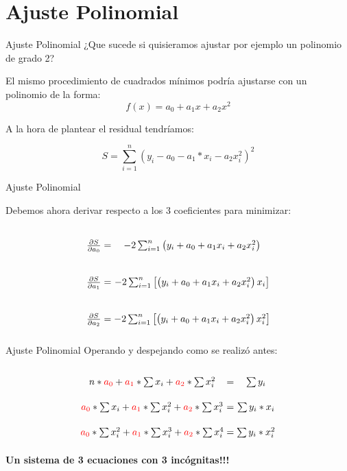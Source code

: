 \documentclass[xcolor=svgnames]{beamer} %
\theoremstyle{plain}
\renewcommand{\textbf}[1]{{\bfseries\textcolor{redUnq2}{#1}}}
\theoremstyle{definition}
\begin{document}
\section{Ajuste Polinomial}

\begin{frame}{Ajuste Polinomial}
  ¿Que sucede si quisieramos ajustar por ejemplo un polinomio de grado 2?\pause
  
  El mismo procedimiento de cuadrados mínimos podría ajustarse con un polinomio de la forma:
  $$ f(x) = a_0 + a_1 x + a_2 x^2$$
  
  A la hora de plantear el residual tendríamos:
  
  $$  S = \sum_{i=1}^n \left(y_i -a_0 -a_1*x_i -a_2 x_i^2\right)^2 $$
  
\end{frame}

\begin{frame}{Ajuste Polinomial}
  
  Debemos ahora derivar respecto a los 3 coeficientes para minimizar:
  $$\arraycolsep=1.4pt\def\arraystretch{3.2} \begin{array}{ccc}
  \frac{\partial S}{\partial a_0} &=& -2 \sum_{i=1}^n \left(y_i + a_0 +a_1 x_i +a_2 x_i^2\right)\\
  \frac{\partial S}{\partial a_1} &=& -2 \sum_{i=1}^n \left[\left(y_i + a_0 +a_1 x_i +a_2 x_i^2\right)x_i\right]\\
    \frac{\partial S}{\partial a_2} &=& -2 \sum_{i=1}^n \left[\left(y_i + a_0 +a_1 x_i +a_2 x_i^2\right)x_i^2\right]\\
\end{array}   $$
  
\end{frame}


\begin{frame}{Ajuste Polinomial}
  Operando y despejando como se realizó antes:
  
  $$\arraycolsep=1.4pt\def\arraystretch{2.2} \begin{array}{ccc}
  n*{\color{red}a_0}+{\color{red}a_1}*\sum x_i +{\color{red}a_2}* \sum x_i^2 &=& \sum y_i\\
  {\color{red}a_0}*\sum x_i+{\color{red}a_1}*\sum x_i^2 +{\color{red}a_2}* \sum x_i^3 &=& \sum y_i*x_i\\
  {\color{red}a_0}*\sum x_i^2+{\color{red}a_1}*\sum x_i^3 +{\color{red}a_2}* \sum x_i^4 &=& \sum y_i*x_i^2
\end{array}   $$\pause

\begin{center}
\begin{tcolorbox} \textbf{Un sistema de 3 ecuaciones con 3 incógnitas!!!} \end{tcolorbox}
\end{center}

\end{frame}
\end{document}

